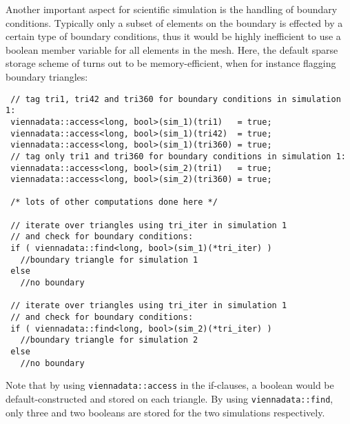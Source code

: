 Another important aspect for scientific simulation is the handling of boundary conditions. Typically only a subset of elements on the boundary is effected by a certain type of boundary conditions, thus it would be highly inefficient to use a boolean member variable for all elements in the mesh. Here, the default sparse storage scheme of {\ViennaData} turns out to be memory-efficient, when for instance flagging boundary triangles:
\begin{lstlisting}
 // tag tri1, tri42 and tri360 for boundary conditions in simulation 1:
 viennadata::access<long, bool>(sim_1)(tri1)   = true;
 viennadata::access<long, bool>(sim_1)(tri42)  = true;
 viennadata::access<long, bool>(sim_1)(tri360) = true;
 // tag only tri1 and tri360 for boundary conditions in simulation 1:
 viennadata::access<long, bool>(sim_2)(tri1)   = true;
 viennadata::access<long, bool>(sim_2)(tri360) = true;

 /* lots of other computations done here */

 // iterate over triangles using tri_iter in simulation 1
 // and check for boundary conditions:
 if ( viennadata::find<long, bool>(sim_1)(*tri_iter) )
   //boundary triangle for simulation 1
 else
   //no boundary

 // iterate over triangles using tri_iter in simulation 1
 // and check for boundary conditions:
 if ( viennadata::find<long, bool>(sim_2)(*tri_iter) )
   //boundary triangle for simulation 2
 else
   //no boundary
\end{lstlisting}
Note that by using \lstinline|viennadata::access| in the if-clauses, a boolean would be default-constructed and stored on each triangle. By using \lstinline|viennadata::find|, only three and two booleans are stored for the two simulations respectively.

